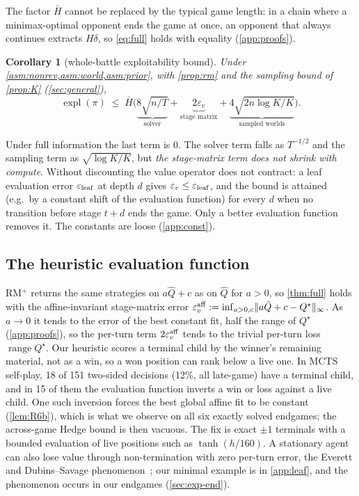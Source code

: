 \documentclass[10pt]{article}
\theoremstyle{plain}
\newtheorem{corollary}[theorem]{Corollary}
\theoremstyle{definition}
\theoremstyle{remark}
\newcommand{\Hbar}{\bar H}
\newcommand{\epsv}{\varepsilon_v}
\newcommand{\Qhat}{\hat Q}
\newcommand{\Qstar}{Q^\star}
\DeclareMathOperator{\expl}{expl}
\DeclareMathOperator{\range}{range}
\begin{document}
The factor $\Hbar$ cannot be replaced by the typical game length: in a chain where a minimax-optimal opponent ends the game at once, an opponent that always continues extracts $H\delta$, so \eqref{eq:full} holds with equality (\cref{app:proofs}).


\begin{corollary}[whole-battle exploitability bound]\label{cor:headline}
Under \cref{asm:nonrev,asm:world,asm:prior}, with \cref{prop:rm} and the sampling bound of \cref{prop:K} (\cref{sec:general}),
\begin{equation}\label{eq:headline}
\expl(\pi)\;\le\;\Hbar\Big(\underbrace{8\sqrt{n/T}}_{\text{solver}}+\underbrace{2\epsv}_{\text{stage matrix}}+\underbrace{4\sqrt{2n\log K/K}}_{\text{sampled worlds}}\Big).
\end{equation}
\end{corollary}
Under full information the last term is 0. The solver term falls as $T^{-1/2}$ and the sampling term as $\sqrt{\log K/K}$, but \emph{the stage-matrix term does not shrink with compute}. Without discounting the value operator does not contract: a leaf evaluation error $\varepsilon_{\rm leaf}$ at depth $d$ gives $\epsv\le\varepsilon_{\rm leaf}$, and the bound is attained (e.g.\ by a constant shift of the evaluation function) for every $d$ when no transition before stage $t+d$ ends the game. Only a better evaluation function removes it. The constants are loose (\cref{app:const}).

\subsection{The heuristic evaluation function}
\label{sec:leaf}
RM$^+$ returns the same strategies on $a\Qhat+c$ as on $\Qhat$ for $a>0$, so \cref{thm:full} holds with the affine-invariant stage-matrix error $\epsv^{\rm aff}:=\inf_{a>0,c}\lVert a\Qhat+c-\Qstar\rVert_\infty$. As $a\to0$ it tends to the error of the best constant fit, half the range of $\Qstar$ (\cref{app:proofs}), so the per-turn term $2\epsv^{\rm aff}$ tends to the trivial per-turn loss $\range\Qstar$.
Our heuristic scores a terminal child by the winner's remaining material, not as a win, so a won position can rank below a live one. In MCTS self-play, 18 of 151 two-sided decisions (12\%, all late-game) have a terminal child, and in 15 of them the evaluation function inverts a win or loss against a live child. One such inversion forces the best global affine fit to be constant (\cref{lem:R6b}), which is what we observe on all six exactly solved endgames; the across-game Hedge bound is then vacuous. The fix is exact $\pm1$ terminals with a bounded evaluation of live positions such as $\tanh(h/160)$. A stationary agent can also lose value through non-termination with zero per-turn error, the Everett and Dubins--Savage phenomenon~\cite{Everett57,DS65,MS96}; our minimal example is in \cref{app:leaf}, and the phenomenon occurs in our endgames (\cref{sec:exp-end}).
\end{document}
